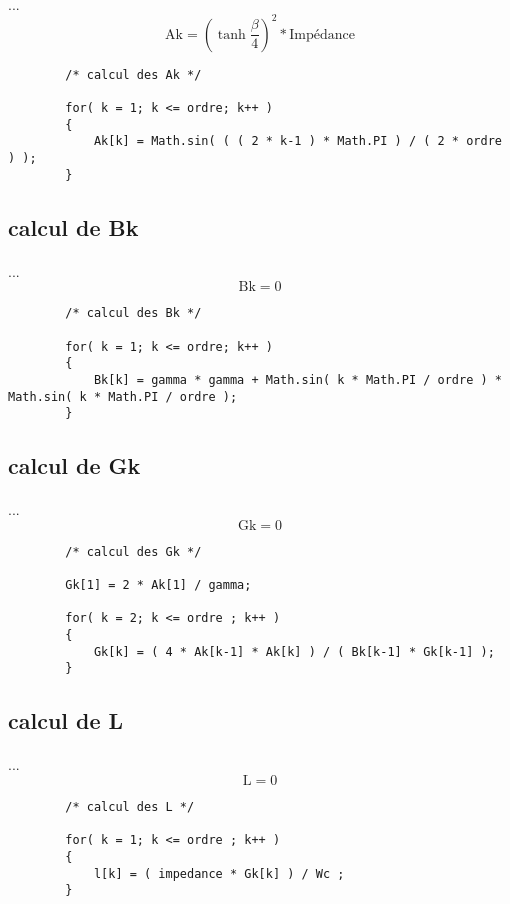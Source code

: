 \documentclass[a4paper,11pt]{article}
\begin{document}
    \paragraph{}
    ... \[ \mbox{Ak} = ( \tanh{ \frac{ \beta }{ 4 } } ) ^2 * \mbox{Impédance} \]
    \begin{lstlisting}
        /* calcul des Ak */

        for( k = 1; k <= ordre; k++ )
        {
            Ak[k] = Math.sin( ( ( 2 * k-1 ) * Math.PI ) / ( 2 * ordre ) );
        }

    \end{lstlisting}

\subsection{calcul de Bk }
    \paragraph{}
    ... \[ \mbox{Bk} = 0 \]
    \begin{lstlisting}
        /* calcul des Bk */

        for( k = 1; k <= ordre; k++ )
        {
            Bk[k] = gamma * gamma + Math.sin( k * Math.PI / ordre ) * Math.sin( k * Math.PI / ordre );
        }

    \end{lstlisting}

\subsection{calcul de Gk }
    \paragraph{}
    ... \[ \mbox{Gk} = 0 \]
    \begin{lstlisting}
        /* calcul des Gk */

        Gk[1] = 2 * Ak[1] / gamma;

        for( k = 2; k <= ordre ; k++ )
        {
            Gk[k] = ( 4 * Ak[k-1] * Ak[k] ) / ( Bk[k-1] * Gk[k-1] );
        }

    \end{lstlisting}

\subsection{calcul de L }
    \paragraph{}
    ... \[ \mbox{L} = 0 \]
    \begin{lstlisting}
        /* calcul des L */

        for( k = 1; k <= ordre ; k++ )
        {
            l[k] = ( impedance * Gk[k] ) / Wc ;
        }

    \end{lstlisting}
\end{document}
